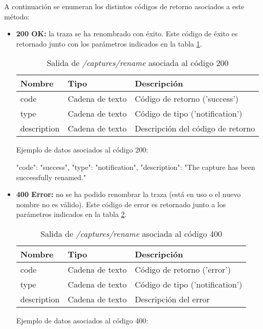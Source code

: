 A continuación se enumeran los distintos códigos de retorno asociados a este método:
\begin{itemize}

\item{\textbf{200 OK:} la \gls{traza} se ha renombrado con éxito. Este código de éxito es retornado junto con los parámetros indicados en la tabla \ref{extra:api:capturesrename:ok}.
\begin{table}[H]
\centering
\begin{tabular}{|l|l|l|}
\hline
\rowcolor[HTML]{F5F5F5}
\textbf{Nombre}  & \textbf{Tipo}   & \textbf{Descripción}              \\ \hline
code             & Cadena de texto & Código de retorno ('success')     \\ \hline
type             & Cadena de texto & Código de tipo ('notification')   \\ \hline
description      & Cadena de texto & Descripción del código de retorno \\ \hline
\end{tabular}
\caption{Salida de \textit{/captures/rename} asociada al código 200}
\label{extra:api:capturesrename:ok}
\end{table}
\begin{minipage}{\textwidth}
Ejemplo de datos asociados al código 200:

\begin{code}[language=json]
{
  "code": "success",
  "type": "notification",
  "description": "The capture has been successfully renamed."
}
\end{code}
\end{minipage}
}

\item{\textbf{400 Error:} no se ha podido renombrar la \gls{traza} (está en uso o el nuevo nombre no es válido). Este código de error es retornado junto a los parámetros indicados en la tabla \ref{extra:api:capturesrename:error}.
\begin{table}[H]
\centering
\begin{tabular}{|l|l|l|}
\hline
\rowcolor[HTML]{F5F5F5}
\textbf{Nombre}  & \textbf{Tipo}   & \textbf{Descripción}            \\ \hline
code             & Cadena de texto & Código de retorno ('error')     \\ \hline
type             & Cadena de texto & Código de tipo ('notification') \\ \hline
description      & Cadena de texto & Descripción del error           \\ \hline
\end{tabular}
\caption{Salida de \textit{/captures/rename} asociada al código 400}
\label{extra:api:capturesrename:error}
\end{table}
\begin{minipage}{\textwidth}
Ejemplo de datos asociados al código 400:


\end{minipage}}
\end{itemize}
